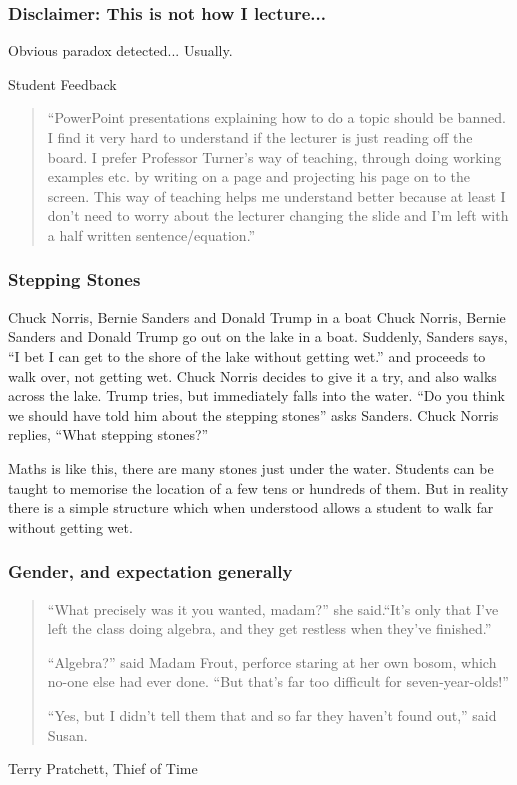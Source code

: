 \documentclass{beamer}
\begin{document}
\begin{frame}
  \frametitle{Disclaimer: This is not how I lecture...}
  \pause  
  Obvious paradox detected...
  \pause
  \alert{Usually.}
  \pause
  \begin{block}{Student Feedback}
  \begin{quote}
 ``PowerPoint presentations explaining how to do a topic should be banned. I find it very hard to understand if the lecturer is just reading off the board. I prefer Professor Turner's way of teaching, through doing working examples etc. by writing on a page and projecting his page on to the screen. This way of teaching helps me understand better because at least I don't need to worry about the lecturer changing the slide and I'm left with a half written sentence/equation.''
  \end{quote}
  \end{block}
\end{frame}


\begin{frame}
  \frametitle{Stepping Stones}

\begin{block}{Chuck Norris, Bernie Sanders and Donald Trump in a boat}  
Chuck Norris, Bernie Sanders and Donald Trump go out on the lake in a boat. Suddenly, Sanders says, ``I bet I can get to the shore of the lake without getting wet.'' and proceeds to walk over, not getting wet. Chuck Norris decides to give it a try, and also walks across the lake. Trump tries, but immediately falls into the water. ``Do you think we should have told him about the stepping stones'' asks Sanders. Chuck Norris replies, ``What stepping stones?''
\end{block}

\pause
Maths is like this, there are many stones just under the water. Students can be taught to memorise the location of a few tens or hundreds of them. But in reality there is a simple structure which when understood allows a student to walk far without getting wet.  
\end{frame}


\begin{frame}
  \frametitle{Gender, and expectation generally}

\begin{block}{}
\begin{quote}
``What precisely was it you wanted, madam?'' she said.``It’s only that I've left the class doing algebra, and they get restless when they’ve finished.''
\medskip

``Algebra?” said Madam Frout, perforce staring at her own bosom, which no-one else had ever done. ``But that’s far too difficult for seven-year-olds!''
\medskip

``Yes, but I didn’t tell them that and so far they haven’t found out,'' said Susan.\end{quote}
\end{block}
\hfill Terry Pratchett, Thief of Time
\end{frame}
\end{document}
